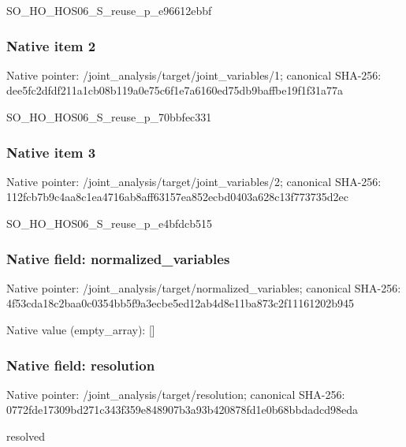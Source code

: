 \documentclass[10pt,a4paper]{article}
\begin{document}
\begingroup\raggedright\sloppy SO\_\allowbreak{}HO\_\allowbreak{}HOS06\_\allowbreak{}S\_\allowbreak{}reuse\_\allowbreak{}p\_\allowbreak{}e96612ebbf\par\endgroup

\subsubsection{Native item 2}
Native pointer: /joint\_\allowbreak{}analysis/target/joint\_\allowbreak{}variables/1; canonical SHA-256: dee5fc2dfdf211a1cb08b119a0e75c6f1e7a6160ed75db9baffbe19f1f31a77a

\begingroup\raggedright\sloppy SO\_\allowbreak{}HO\_\allowbreak{}HOS06\_\allowbreak{}S\_\allowbreak{}reuse\_\allowbreak{}p\_\allowbreak{}70bbfec331\par\endgroup

\subsubsection{Native item 3}
Native pointer: /joint\_\allowbreak{}analysis/target/joint\_\allowbreak{}variables/2; canonical SHA-256: 112fcb7b9c4aa8c1ea4716ab8aff63157ea852ecbd0403a628c13f773735d2ec

\begingroup\raggedright\sloppy SO\_\allowbreak{}HO\_\allowbreak{}HOS06\_\allowbreak{}S\_\allowbreak{}reuse\_\allowbreak{}p\_\allowbreak{}e4bfdcb515\par\endgroup

\subsubsection{Native field: normalized\_\allowbreak{}variables}
Native pointer: /joint\_\allowbreak{}analysis/target/normalized\_\allowbreak{}variables; canonical SHA-256: 4f53cda18c2baa0c0354bb5f9a3ecbe5ed12ab4d8e11ba873c2f11161202b945

Native value (empty\_\allowbreak{}array): []

\subsubsection{Native field: resolution}
Native pointer: /joint\_\allowbreak{}analysis/target/resolution; canonical SHA-256: 0772fde17309bd271c343f359e848907b3a93b420878fd1e0b68bbdadcd98eda

\begingroup\raggedright\sloppy resolved\par\endgroup
\end{document}
